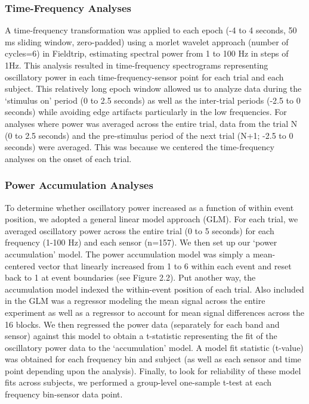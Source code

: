 \subsubsection{Time-Frequency Analyses}\label{time-frequency-analyses}

A time-frequency transformation was applied to each epoch (-4 to 4
seconds, 50 ms sliding window, zero-padded) using a morlet wavelet
approach (number of cycles=6) in Fieldtrip, estimating spectral power
from 1 to 100 Hz in steps of 1Hz. This analysis resulted in
time-frequency spectrograms representing oscillatory power in each
time-frequency-sensor point for each trial and each subject. This
relatively long epoch window allowed us to analyze data during the
`stimulus on' period (0 to 2.5 seconds) as well as the inter-trial
periods (-2.5 to 0 seconds) while avoiding edge artifacts particularly
in the low frequencies. For analyses where power was averaged across the
entire trial, data from the trial N (0 to 2.5 seconds) and the
pre-stimulus period of the next trial (N+1; -2.5 to 0 seconds) were
averaged. This was because we centered the time-frequency analyses on
the onset of each trial.

\subsubsection{Power Accumulation
Analyses}\label{power-accumulation-analyses}

To determine whether oscillatory power increased as a function of within
event position, we adopted a general linear model approach (GLM). For
each trial, we averaged oscillatory power across the entire trial (0 to
5 seconds) for each frequency (1-100 Hz) and each sensor (n=157). We
then set up our `power accumulation' model. The power accumulation model
was simply a mean-centered vector that linearly increased from 1 to 6
within each event and reset back to 1 at event boundaries (see Figure
2.2). Put another way, the accumulation model indexed the within-event
position of each trial. Also included in the GLM was a regressor
modeling the mean signal across the entire experiment as well as a
regressor to account for mean signal differences across the 16 blocks.
We then regressed the power data (separately for each band and sensor)
against this model to obtain a t-statistic representing the fit of the
oscillatory power data to the `accumulation' model. A model fit
statistic (t-value) was obtained for each frequency bin and subject (as
well as each sensor and time point depending upon the analysis).
Finally, to look for reliability of these model fits across subjects, we
performed a group-level one-sample t-test at each frequency bin-sensor
data point.

